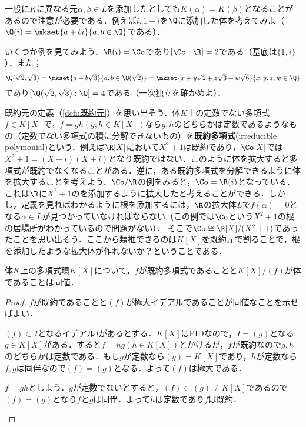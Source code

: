 一般に$K$に異なる元$\alpha,\beta\in L$を添加したとしても$K(\alpha)=K(\beta)$となることがあるので注意が必要である．例えば$i,1+i$を$\Q$に添加した体を考えてみよ（$\Q(i)=\mkset{a+bi}{a,b\in\Q}$である）．

いくつか例を見てみよう．$\R(i)=\Co$であり$[\Co:\R]=2$である（基底は$\{1,i\}$）．また；
\[\Q(\sqrt{2},\sqrt{3})=\mkset{a+b\sqrt{3}}{a,b\in\Q(\sqrt{2})}=\mkset{x+y\sqrt{2}+z\sqrt{3}+w\sqrt{6}}{x,y,z,w\in\Q}\]
であり$[\Q(\sqrt{2},\sqrt{3}):\Q]=4$である（一次独立を確かめよ）．

既約元の定義（\ref{defi:既約元}）を思い出そう．体$K$上の定数でない多項式$f\in K[X]$で，$f=gh (g,h\in K[X])$なら$g,h$のどちらかは定数であるようなもの（定数でない多項式の積に分解できないもの）を\textbf{既約多項式}(irreducible polymonial)という．例えば$\R[X]$において$X^2+1$は既約であり，$\Co[X]$では$X^2+1=(X-i)(X+i)$となり既約ではない．このように体を拡大すると多項式が既約でなくなることがある．逆に，ある既約多項式を分解できるように体を拡大することを考えよう．$\Co/\R$の例をみると，$\Co=\R(i)$となっている．これは$\R$に$X^2+1$のを添加するように拡大したと考えることができる．しかし，定義を見ればわかるように根を添加するには，$\R$の拡大体$L$で$f(\alpha)=0$となる$\alpha\in L$が見つかっていなければならない（この例では$\Co$という$X^2+1$の根の居場所がわかっているので問題がない）． そこで$\Co\cong\R[X]/(X^2+1)$であったことを思い出そう．ここから類推できるのは$K[X]$を既約元で割ることで，根を添加したような拡大体が作れないか？ということである．

\begin{prop}
	体$K$上の多項式環$K[X]$について，$f$が既約多項式であることと$K[X]/(f)$が体であることは同値．
\end{prop}

\begin{proof}
	$f$が既約であることと$(f)$が極大イデアルであることが同値なことを示せばよい．
	
	\begin{eqv}
		\item $(f)\subset I$となるイデアル$I$があるとする．$K[X]$はPIDなので，$I=(g)$となる$g\in K[X]$がある．すると$f=hg (h\in K[X])$とかけるが，$f$が既約なので$g,h$のどちらかは定数である．もし$g$が定数なら$(g)=K[X]$であり，$h$が定数なら$f,g$は同伴なので$(f)=(g)$となる．よって$(f)$は極大である．
		\item $f=gh$としよう．$g$が定数でないとすると，$(f)\subset(g)\neq K[X]$であるので$(f)=(g)$となり$f$と$g$は同伴．よって$h$は定数であり$f$は既約．
	\end{eqv}
\end{proof}

